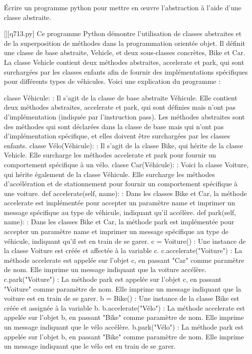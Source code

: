         \question
        Écrire un programme python pour mettre en œuvre l'abstraction à l'aide d'une classe abstraite.
        \par
        \begin{solution}
            \renewcommand{\nomfichier}{q713.py}
            \pythonfile{\chemincode \nomfichier}[][\nomfichier]
            Ce programme Python démontre l'utilisation de classes abstraites et de la superposition de méthodes dans la programmation orientée objet. Il définit une classe de base abstraite, Vehicle, et deux sous-classes concrètes, Bike et Car. La classe Vehicle contient deux méthodes abstraites, accelerate et park, qui sont surchargées par les classes enfants afin de fournir des implémentations spécifiques pour différents types de véhicules. Voici une explication du programme :

    classe Véhicule: : Il s'agit de la classe de base abstraite Véhicule. Elle contient deux méthodes abstraites, accelerate et park, qui sont définies mais n'ont pas d'implémentation (indiquée par l'instruction pass). Les méthodes abstraites sont des méthodes qui sont déclarées dans la classe de base mais qui n'ont pas d'implémentation spécifique, et elles doivent être surchargées par les classes enfants.
    classe Vélo(Véhicule): : Il s'agit de la classe Bike, qui hérite de la classe Vehicle. Elle surcharge les méthodes accelerate et park pour fournir un comportement spécifique à un vélo.
    classe Car(Véhicule): : Voici la classe Voiture, qui hérite également de la classe Véhicule. Elle surcharge les méthodes d'accélération et de stationnement pour fournir un comportement spécifique à une voiture.
    def accelerate(self, name): : Dans les classes Bike et Car, la méthode accelerate est implémentée pour accepter un paramètre name et imprimer un message spécifique au type de véhicule, indiquant qu'il accélère.
    def park(self, name): : Dans les classes Bike et Car, la méthode park est implémentée pour accepter un paramètre name et imprimer un message spécifique au type de véhicule, indiquant qu'il est en train de se garer.
    c = Voiture() : Une instance de la classe Voiture est créée et affectée à la variable c.
    c.accelerate("Voiture") : La méthode accelerate est appelée sur l'objet c, en passant "Car" comme paramètre de nom. Elle imprime un message indiquant que la voiture accélère.
    c.park("Voiture") : La méthode park est appelée sur l'objet c, en passant "Voiture" comme paramètre de nom. Elle imprime un message indiquant que la voiture est en train de se garer.
    b = Bike() : Une instance de la classe Bike est créée et assignée à la variable b.
    b.accelerate("Vélo") : La méthode accelerate est appelée sur l'objet b, en passant "Bike" comme paramètre de nom. Elle imprime un message indiquant que le vélo accélère.
    b.park("Vélo") : La méthode park est appelée sur l'objet b, en passant "Bike" comme paramètre de nom. Elle imprime un message indiquant que le vélo est en train de se garer.


\end{solution}
